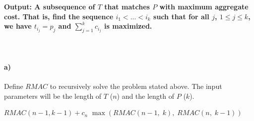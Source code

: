 \documentclass{article}
\begin{document}
\\ \\ \textbf{Output: A subsequence of $T$ that matches $P$ with maximum aggregate cost. That is, find the sequence $i_1 < ... < i_k$ such that for all  $j$, $1 \le j \le k$, we have $t_{i_j} = p_j$ and $\sum \limits_{j=1}^{k} c_{i_j}$ is maximized.}
\\ \\ \\ \\
\textbf{a)} 
\\ \\ Define $RMAC$ to recursively solve the problem stated above. The input parameters will be the length of $T$ ($n$) and the length of $P$ ($k$).
\\
\begin{algorithmic}[1]
		\State {}
	\EndIf
		\State \Return $RMAC(n-1,k-1) + c_n$
	\EndIf
	\State \Return $\max(RMAC(n-1,\; k),\; RMAC(n,\; k-1))$
\EndFunction
\end{algorithmic}
\end{document}
